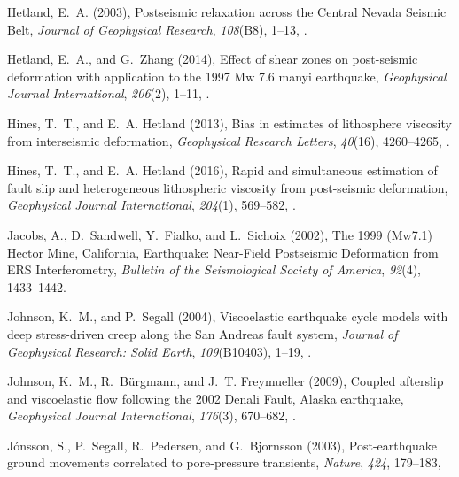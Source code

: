 \documentclass[draft,linenumbers]{AGUJournal}
\begin{document}
\begin{thebibliography}{52}
Hetland, E.~A. (2003), {Postseismic relaxation across the Central Nevada Seismic Belt}, \textit{Journal of Geophysical Research}, \textit{108}(B8), 1--13, .

Hetland, E.~A., and G.~Zhang (2014), {Effect of shear zones on post-seismic deformation with application to the 1997 Mw 7.6 manyi earthquake}, \textit{Geophysical Journal International}, \textit{206}(2), 1--11, .

Hines, T.~T., and E.~A. Hetland (2013), {Bias in estimates of lithosphere viscosity from interseismic deformation}, \textit{Geophysical Research Letters}, \textit{40}(16), 4260--4265, .

Hines, T.~T., and E.~A. Hetland (2016), {Rapid and simultaneous estimation of fault slip and heterogeneous lithospheric viscosity from post-seismic deformation}, \textit{Geophysical Journal International}, \textit{204}(1), 569--582, .

Jacobs, A., D.~Sandwell, Y.~Fialko, and L.~Sichoix (2002), {The 1999 (Mw7.1) Hector Mine, California, Earthquake: Near-Field Postseismic Deformation from ERS Interferometry}, \textit{Bulletin of the Seismological Society of America}, \textit{92}(4), 1433--1442.

Johnson, K.~M., and P.~Segall (2004), {Viscoelastic earthquake cycle models with deep stress-driven creep along the San Andreas fault system}, \textit{Journal of Geophysical Research: Solid Earth}, \textit{109}(B10403), 1--19, .

Johnson, K.~M., R.~B{\"{u}}rgmann, and J.~T. Freymueller (2009), {Coupled afterslip and viscoelastic flow following the 2002 Denali Fault, Alaska earthquake}, \textit{Geophysical Journal International}, \textit{176}(3), 670--682, .

J{\'{o}}nsson, S., P.~Segall, R.~Pedersen, and G.~Bjornsson (2003), {Post-earthquake ground movements correlated to pore-pressure transients}, \textit{Nature}, \textit{424}, 179--183, 


\end{thebibliography}
\end{document}
